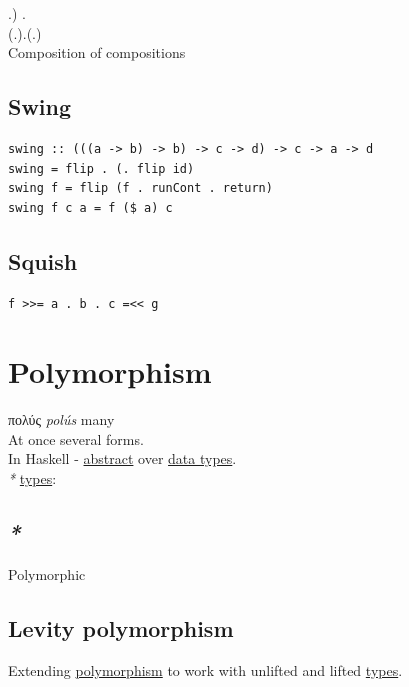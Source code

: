 \documentclass[a4paper,14pt,oneside]{book}
\begin{document}
\label{orgecb94c0}.) .\\
\label{org735d80a}(.).(.)\\
\label{org34c6a4f}Composition of compositions\\

\section{\label{orgd1f7fdc}Swing}
\label{sec:org93c5689}
\begin{verbatim}
swing :: (((a -> b) -> b) -> c -> d) -> c -> a -> d
swing = flip . (. flip id)
swing f = flip (f . runCont . return)
swing f c a = f ($ a) c
\end{verbatim}

\section{\label{org4d71ece}Squish}
\label{sec:orgc9ff10e}
\begin{verbatim}
f >>= a . b . c =<< g
\end{verbatim}

\chapter{\label{org578fb61}Polymorphism}
\label{sec:orged1962a}
πολύς \emph{polús} many\\

At once several forms.\\

In Haskell - \hyperref[org321fc4b]{abstract} over \hyperref[org6ad0f56]{data types}.\\

\emph{*} \hyperref[org9e7edc9]{types}:\\

\section{\emph{*}}
\label{sec:org70574b5}

\label{org0255a02}Polymorphic\\

\section{\label{org3ba1e72}Levity polymorphism}
\label{sec:org3033897}
Extending \hyperref[org578fb61]{polymorphism} to work with unlifted and lifted \hyperref[org9e7edc9]{types}.\\
\end{document}
